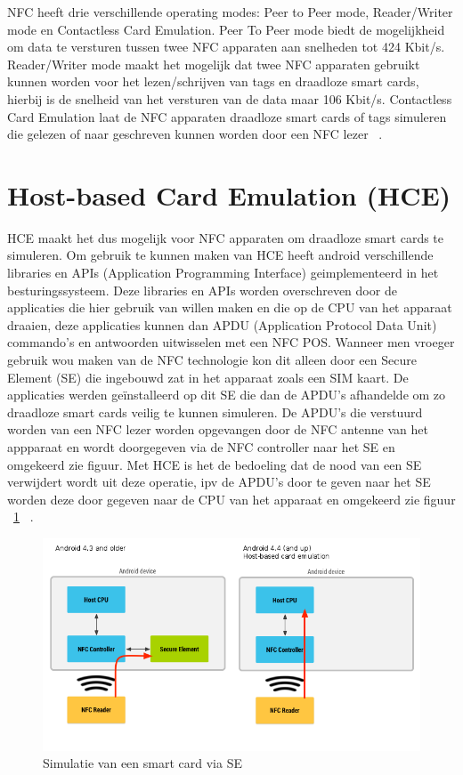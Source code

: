 NFC heeft drie verschillende operating modes: Peer to Peer mode, Reader/Writer mode en Contactless Card Emulation. Peer To Peer mode biedt de mogelijkheid om data te versturen tussen twee NFC apparaten aan snelheden tot 424 Kbit/s. Reader/Writer mode maakt het mogelijk dat twee NFC apparaten gebruikt kunnen worden voor het lezen/schrijven van tags en draadloze smart cards, hierbij is de snelheid van het versturen van de data maar 106 Kbit/s. Contactless Card Emulation laat de NFC apparaten draadloze smart cards of tags simuleren die gelezen of naar geschreven kunnen worden door een NFC lezer ~\autocite{Alattar2014}. 

\section{Host-based Card Emulation (HCE)}
\label{sec:HCE}
HCE maakt het dus mogelijk voor NFC apparaten om draadloze smart cards te simuleren. Om gebruik te kunnen maken van HCE heeft android verschillende libraries en APIs (Application Programming Interface) geimplementeerd in het besturingssysteem. Deze libraries en APIs worden overschreven door de applicaties die hier gebruik van willen maken en die op de CPU van het apparaat draaien, deze applicaties kunnen dan APDU (Application Protocol Data Unit) commando's en antwoorden uitwisselen met een NFC POS. Wanneer men vroeger gebruik wou maken van de NFC technologie kon dit alleen door een Secure Element (SE) die ingebouwd zat in het apparaat zoals een SIM kaart. De applicaties werden geïnstalleerd op dit SE die dan de APDU's afhandelde om zo draadloze smart cards veilig te kunnen simuleren. De APDU's die verstuurd worden van een NFC lezer worden opgevangen door de NFC antenne van het appparaat en wordt doorgegeven via de NFC controller naar het SE en omgekeerd zie figuur. Met HCE is het de bedoeling dat de nood van een SE verwijdert wordt uit deze operatie, ipv de APDU's door te geven naar het SE worden deze door gegeven naar de CPU van het apparaat en omgekeerd zie figuur ~\ref{fig:SE-HCE} ~\autocite{Alattar2014}. 

\begin{figure}
	\includegraphics[width=\linewidth]
	{img/WalletHostBasedCardEmulation}
	\caption{Simulatie van een smart card via SE}
	\label{fig:SE-HCE}
\end{figure}
